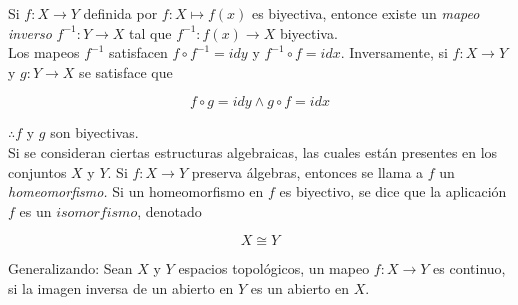 \documentclass{report}
\begin{document}
Si $f : X \rightarrow Y$ definida por $f : X \mapsto f(x)$ es biyectiva, entonce existe un \textit{mapeo inverso} $f^{-1} : Y \rightarrow X$ tal que $f ^{-1} : f(x) \rightarrow X$ biyectiva.\\

Los mapeos $f^{-1}$ satisfacen $f \circ f ^{-1} = idy$ y $f^{-1}\circ f = idx$. Inversamente, si $f : X \rightarrow Y$ y $g : Y \rightarrow X$ se satisface que

 \begin{equation}
f \circ g = i dy \wedge g \circ f = i dx
 \end{equation}

$\therefore f$ y $g$ son biyectivas.\\

 Si se consideran ciertas estructuras algebraicas, las cuales están presentes en los conjuntos $X$ y $Y$. Si $f : X \rightarrow Y$ preserva álgebras, entonces se llama a $f$ un \textit{homeomorfismo.} Si un homeomorfismo en $f$ es biyectivo, se dice que la aplicación $f$ es un $isomorfismo$, denotado

\begin{equation}
X \cong Y
\end{equation}

Generalizando: Sean $X$ y $Y$ espacios topológicos, un mapeo $f : X \rightarrow Y$ es continuo, si la imagen inversa de un abierto en $Y$ es un abierto en $X$. \\





\end{document}
